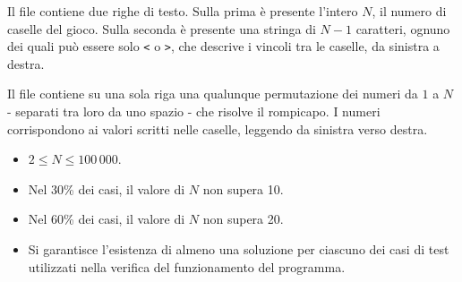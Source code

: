 
	\InputFile
	Il file  contiene due righe di testo. Sulla prima è presente l'intero $N$, il numero di caselle del gioco. Sulla seconda è presente una stringa di $N-1$ caratteri, ognuno dei quali può essere solo \verb|<| o \verb|>|, che descrive i vincoli tra le caselle, da sinistra a destra.


	\OutputFile
	Il file \outputfile{} contiene su una sola riga una qualunque permutazione dei numeri da $1$ a $N$ - separati tra loro da uno spazio - che risolve il rompicapo. I numeri corrispondono ai valori scritti nelle caselle, leggendo da sinistra verso destra.
	


\Constraints

\begin{itemize}[nolistsep, itemsep=2mm]
	\item $2 \le N \le 100\,000$.
	\item Nel 30\% dei casi, il valore di $N$ non supera 10.
	\item Nel 60\% dei casi, il valore di $N$ non supera 20.
	\item Si garantisce l'esistenza di almeno una soluzione per ciascuno dei casi di test utilizzati nella verifica del funzionamento del programma.
\end{itemize}


\Examples

\begin{example}
%
%
%
\end{example}


\newpage
\begin{solution}
	
\end{solution}
